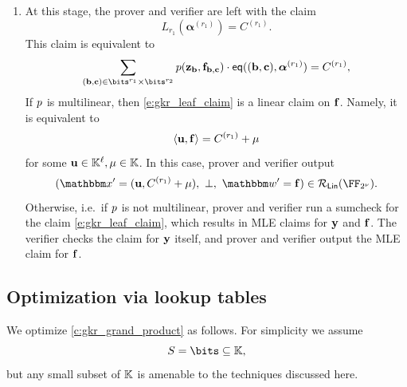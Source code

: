 \documentclass[11pt,letterpaper,usenames,dvipsnames]{article}
\begin{document}
\begin{construction}
\begin{enumerate}[leftmargin=*]
\begin{enumerate}[leftmargin=*]
\begin{enumerate}[leftmargin=*]
        \item The claim \eqref{e:gkr_intermediate} is replaced by
        $$
        L_{i+1}(\rr_\bb^{(i)},\beta^{(i)},\rr_{\cc}^{(i)}) = C^{(i+1)} \defeq a_0^{(i)} \cdot (1-\beta^{(i)}) + a_1^{(i)} \cdot \beta^{(i)}.
        $$
        Let 
        $$
        \bm{\alpha}^{(i+1)} \defeq (\rr_\bb^{(i)},\beta^{(i)},\rr_{\cc}^{(i)}).
        $$
    \end{enumerate}
    \end{enumerate}
    \item At this stage, the prover and verifier are left with the claim
    $$
    L_{r_1}(\bm{\alpha}^{(r_1)}) = C^{(r_1)}.
    $$
    This claim is equivalent to
    \begin{equation}\label{e:gkr_leaf_claim}
    \sum_{(\bb,\cc)\in \bits^{r_1} \times \bits^{r_2}} \gkrpol(\zz_{\bb},\bff_{\bb,\cc}) \cdot \eq((\bb,\cc), \bm{\alpha}^{(r_1)}) = C^{(r_1)},
    \end{equation}
    If $p$ is multilinear, then \eqref{e:gkr_leaf_claim} is a linear claim on $\mathbf{f}$. Namely, it is equivalent to
    $$
    \langle \mathbf{u}, \mathbf{f} \rangle = C^{(r_1)} + \mu
    $$
    for some $\mathbf{u}\in \mathbb{K}^{\ell}, \mu\in \mathbb{K}$. In this case, prover and verifier output 
        $$
    (\inp'=(\uu, C^{(r_1)}+\mu),\ \bot, \ \wit' = \bff) \in \LIN(\comfield).
    $$
    Otherwise, i.e.\ if $p$ is not multilinear, prover and verifier run a sumcheck for the claim \eqref{e:gkr_leaf_claim}, which results in MLE claims for $\mathbf{y}$ and $\mathbf{f}$. The verifier checks the claim for $\mathbf{y}$ itself, and prover and verifier output the MLE claim for $\mathbf{f}$.
\end{enumerate}
    
\end{construction}


\subsection{Optimization via lookup tables} We optimize \cref{c:gkr_grand_product} as follows.  For simplicity we assume
%
$$
S=\bits \subseteq \KK,
$$
but any small subset of $\mathbb{K}$ is amenable to the techniques discussed here.

 
\end{document}
